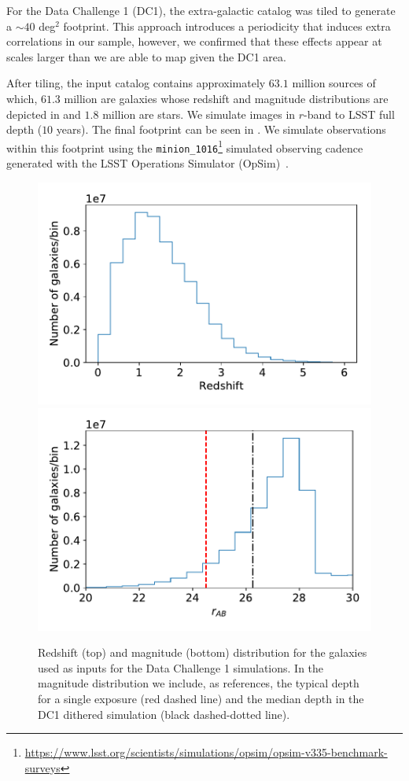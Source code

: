 \documentclass[twocolumn]{aastex62}
\begin{document}
For the Data Challenge 1 (DC1), the extra-galactic catalog was tiled to generate a $\sim 40$ deg$^{2}$ footprint. This approach introduces a periodicity that induces extra correlations in our sample, however, we confirmed that these effects appear at scales larger than we are able to map given the DC1 area.

After tiling, the input catalog contains approximately $63.1$ million sources of which, $61.3$ million are galaxies whose redshift and magnitude distributions are depicted in  and $1.8$ million are stars. We simulate images in $r$-band to LSST full depth ($10$ years). The final footprint can be seen in . We simulate observations within this footprint using the \texttt{minion\_1016}\footnote{\url{https://www.lsst.org/scientists/simulations/opsim/opsim-v335-benchmark-surveys}} simulated observing cadence generated with the LSST Operations Simulator (OpSim)~\citep{2014SPIE.9150E..15D}.

\begin{figure}
\centering
\includegraphics[width=0.9\columnwidth]{N_z_DC1.pdf}
\includegraphics[width=0.9\columnwidth]{N_m_DC1.pdf}
\caption{Redshift (top) and magnitude (bottom) distribution for the galaxies used as inputs for the Data Challenge 1 simulations. In the magnitude distribution we include, as references, the typical depth for a single exposure (red dashed line) and the median depth in the DC1 dithered simulation (black dashed-dotted line).}
\label{fig:catalog_plots}
\end{figure}
\end{document}
